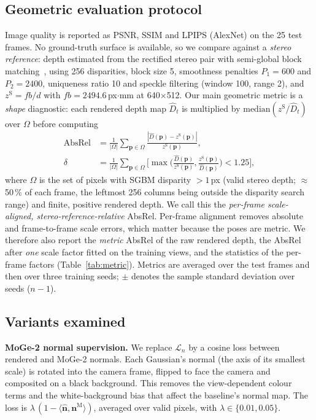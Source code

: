 \documentclass[conference]{IEEEtran}
\begin{document}
\subsection{Geometric evaluation protocol}
\label{sec:evalproto}
Image quality is reported as PSNR, SSIM and LPIPS (AlexNet) on the 25 test frames. No ground-truth surface is available, so we compare against a \emph{stereo reference}: depth estimated from the rectified stereo pair with semi-global block matching~\cite{hirschmuller2008sgm}, using 256 disparities, block size 5, smoothness penalties $P_1{=}600$ and $P_2{=}2400$, uniqueness ratio 10 and speckle filtering (window 100, range 2), and $z^{\mathrm{S}}=fb/d$ with $fb{=}2494.6$\,px$\cdot$mm at 640$\times$512. Our main geometric metric is a \emph{shape} diagnostic: each rendered depth map $\hat{D}_t$ is multiplied by $\mathrm{median}(z^{\mathrm{S}}/\hat{D}_t)$ over $\Omega$ before computing
\begin{align}
\mathrm{AbsRel}&=\frac{1}{|\Omega|}\sum_{\mathbf{p}\in\Omega}\frac{|\hat{D}(\mathbf{p})-z^{\mathrm{S}}(\mathbf{p})|}{z^{\mathrm{S}}(\mathbf{p})},\\
\delta&=\frac{1}{|\Omega|}\sum_{\mathbf{p}\in\Omega}\Big[\max\!\Big(\frac{\hat{D}(\mathbf{p})}{z^{\mathrm{S}}(\mathbf{p})},\frac{z^{\mathrm{S}}(\mathbf{p})}{\hat{D}(\mathbf{p})}\Big)<1.25\Big],
\end{align}
where $\Omega$ is the set of pixels with SGBM disparity $>1$\,px (valid stereo depth; $\approx$50\,\% of each frame, the leftmost 256 columns being outside the disparity search range) and finite, positive rendered depth. We call this the \emph{per-frame scale-aligned, stereo-reference-relative} AbsRel. Per-frame alignment removes absolute and frame-to-frame scale errors, which matter because the poses are metric. We therefore also report the \emph{metric} AbsRel of the raw rendered depth, the AbsRel after \emph{one} scale factor fitted on the training views, and the statistics of the per-frame factors (Table~\ref{tab:metric}). Metrics are averaged over the test frames and then over three training seeds; $\pm$ denotes the sample standard deviation over seeds ($n{-}1$).

\subsection{Variants examined}
\textbf{MoGe-2 normal supervision.} We replace $\mathcal{L}_n$ by a cosine loss between rendered and MoGe-2 normals. Each Gaussian's normal (the axis of its smallest scale) is rotated into the camera frame, flipped to face the camera and composited on a black background. This removes the view-dependent colour terms and the white-background bias that affect the baseline's normal map. The loss is $\lambda\,(1-\langle\hat{\mathbf{n}},\mathbf{n}^{\mathrm{M}}\rangle)$, averaged over valid pixels, with $\lambda\in\{0.01,0.05\}$.
\end{document}

